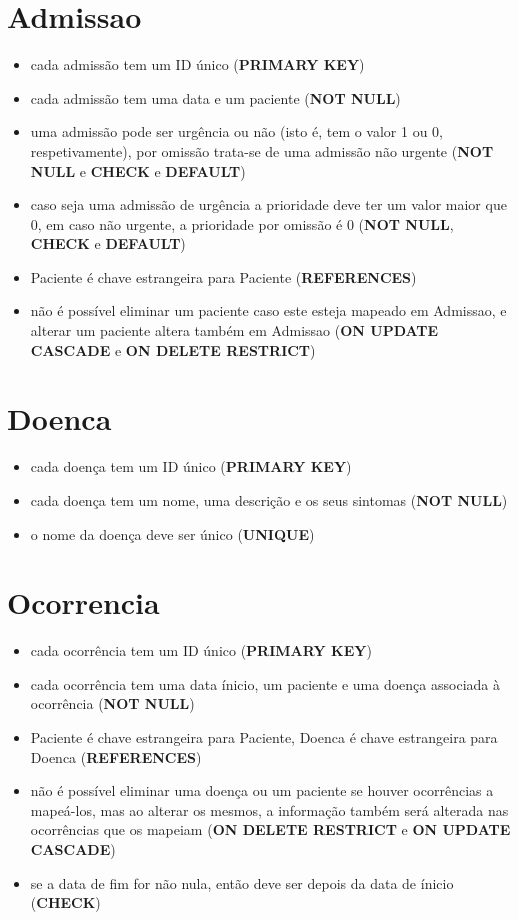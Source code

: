 \documentclass[article, a4paper, 12pt, oneside]{memoir}
\begin{document}
\section*{Admissao}
\begin{itemize}
	\item cada admissão tem um ID único (\textbf{PRIMARY KEY})
	\item cada admissão tem uma data e um paciente (\textbf{NOT NULL})
	\item uma admissão pode ser urgência ou não (isto é, tem o valor 1 ou 0, respetivamente), por omissão trata-se de uma admissão não urgente (\textbf{NOT NULL} e \textbf{CHECK} e \textbf{DEFAULT})
	\item caso seja uma admissão de urgência a prioridade deve ter um valor maior que 0, em caso não urgente, a prioridade por omissão é 0 (\textbf{NOT NULL}, \textbf{CHECK} e \textbf{DEFAULT})
	\item Paciente é chave estrangeira para Paciente (\textbf{REFERENCES})
	\item não é possível eliminar um paciente caso este esteja mapeado em Admissao, e alterar um paciente altera também em Admissao (\textbf{ON UPDATE CASCADE} e \textbf{ON DELETE RESTRICT})
\end{itemize}

\section*{Doenca}
\begin{itemize}
	\item cada doença tem um ID único (\textbf{PRIMARY KEY})
	\item cada doença tem um nome, uma descrição e os seus sintomas (\textbf{NOT NULL})
	\item o nome da doença deve ser único (\textbf{UNIQUE})
\end{itemize}

\section*{Ocorrencia}
\begin{itemize}
	\item cada ocorrência tem um ID único (\textbf{PRIMARY KEY})
	\item cada ocorrência tem uma data ínicio, um paciente e uma doença associada à ocorrência (\textbf{NOT NULL})
	\item Paciente é chave estrangeira para Paciente, Doenca é chave estrangeira para Doenca (\textbf{REFERENCES})
	\item não é possível eliminar uma doença ou um paciente se houver ocorrências a mapeá-los, mas ao alterar os mesmos, a informação também será alterada nas ocorrências que os mapeiam (\textbf{ON DELETE RESTRICT} e \textbf{ON UPDATE CASCADE})
	\item se a data de fim for não nula, então deve ser depois da data de ínicio (\textbf{CHECK})
\end{itemize}
\end{document}
